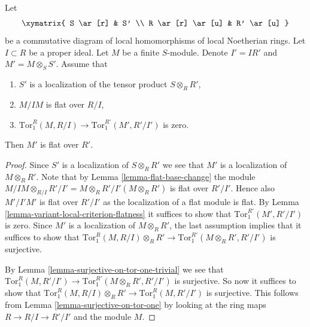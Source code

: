 \begin{lemma}
\label{lemma-another-variant-local-criterion-flatness}
Let
$$
\xymatrix{
S \ar[r] & S' \\
R \ar[r] \ar[u] & R' \ar[u]
}
$$
be a commutative diagram of local homomorphisms of local Noetherian rings.
Let $I \subset R$ be a proper ideal.
Let $M$ be a finite $S$-module.
Denote $I' = IR'$ and $M' = M \otimes_S S'$.
Assume that
\begin{enumerate}
\item $S'$ is a localization of the tensor product
$S \otimes_R R'$,
\item $M/IM$ is flat over $R/I$,
\item $\text{Tor}_1^R(M, R/I) \to \text{Tor}_1^{R'}(M', R'/I')$
is zero.
\end{enumerate}
Then $M'$ is flat over $R'$.
\end{lemma}

\begin{proof}
Since $S'$ is a localization of $S \otimes_R R'$ we see that
$M'$ is a localization of $M \otimes_R R'$. Note that
by Lemma \ref{lemma-flat-base-change} the module $M/IM \otimes_{R/I} R'/I'
= M \otimes_R R' /I'(M \otimes_R R')$ is flat over $R'/I'$. Hence also
$M'/I'M'$ is flat over $R'/I'$ as the localization of a flat module
is flat. By Lemma \ref{lemma-variant-local-criterion-flatness}
it suffices to show that $\text{Tor}_1^{R'}(M', R'/I')$ is zero.
Since $M'$ is a localization of $M \otimes_R R'$, the last assumption
implies that it suffices to show that
$\text{Tor}_1^R(M, R/I) \otimes_R R'
\to
\text{Tor}_1^{R'}(M \otimes_R R', R'/I')$
is surjective.

\medskip\noindent
By Lemma \ref{lemma-surjective-on-tor-one-trivial} we see that
$\text{Tor}_1^R(M, R'/I') \to \text{Tor}_1^{R'}(M \otimes_R R', R'/I')$
is surjective. So now it suffices to show that
$\text{Tor}_1^R(M, R/I) \otimes_R R'
\to
\text{Tor}_1^R(M, R'/I')$
is surjective. This follows from Lemma \ref{lemma-surjective-on-tor-one}
by looking at the ring maps $R \to R/I \to R'/I'$ and the module $M$.
\end{proof}
